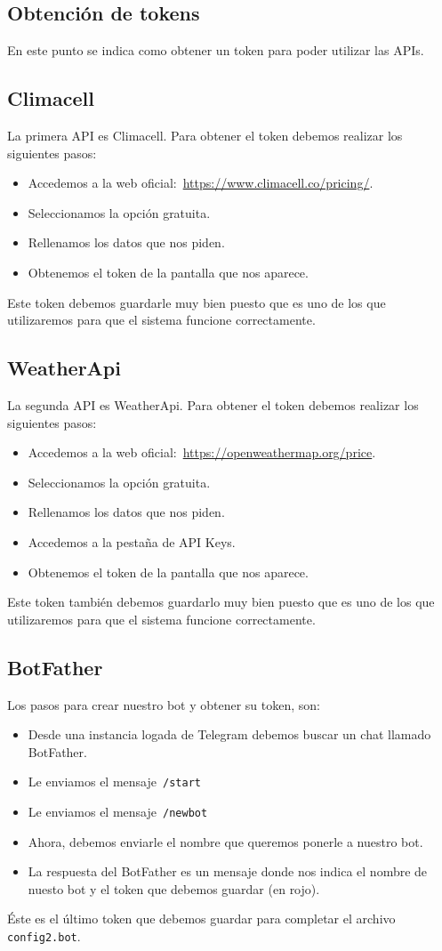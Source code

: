 \subsection{Obtención de tokens}
En este punto se indica como obtener un token para poder utilizar las APIs.

\subsection{Climacell}
La primera API es Climacell. Para obtener el token debemos realizar los siguientes pasos:
\begin{itemize}
    \item Accedemos a la web oficial:~\url{https://www.climacell.co/pricing/}.
    \item Seleccionamos la opción gratuita.
    \item Rellenamos los datos que nos piden.
    \item Obtenemos el token de la pantalla que nos aparece.
\end{itemize}
Este token debemos guardarle muy bien puesto que es uno de los que utilizaremos para que el sistema funcione correctamente.

\subsection{WeatherApi}
La segunda API es WeatherApi. Para obtener el token debemos realizar los siguientes pasos:
\begin{itemize}
    \item Accedemos a la web oficial:~\url{https://openweathermap.org/price}.
    \item Seleccionamos la opción gratuita.
    \item Rellenamos los datos que nos piden.
    \item Accedemos a la pestaña de API Keys.
    \item Obtenemos el token de la pantalla que nos aparece.
\end{itemize}
Este token también debemos guardarlo muy bien puesto que es uno de los que utilizaremos para que el sistema funcione correctamente.

\subsection{BotFather}
Los pasos para crear nuestro bot y obtener su token, son:
\begin{itemize}
    \item Desde una instancia logada de Telegram debemos buscar un chat llamado BotFather.
    \item Le enviamos el mensaje~\texttt{/start}
    \item Le enviamos el mensaje~\texttt{/newbot}
    \item Ahora, debemos enviarle el nombre que queremos ponerle a nuestro bot.
    \item La respuesta del BotFather es un mensaje donde nos indica el nombre de nuesto bot y el token que debemos guardar (en rojo).
\end{itemize}
Éste es el último token que debemos guardar para completar el archivo \texttt{config2.bot}.


